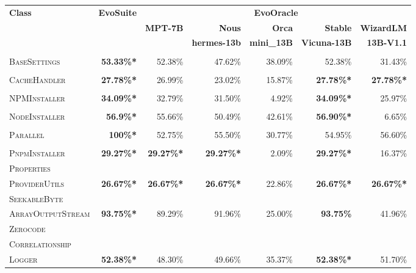 \begin{table}[H]
\centering

\begin{tabular}{| l | r | r | r | r | r | r |}
\hline
\multirow{2}{*}{\textbf{Class}} & \multirow{2}{*}{\textbf{EvoSuite}} & \multicolumn{5}{c|}{\textbf{EvoOracle}} \\ %
\cline{3-7} %
 &  & \textbf{MPT-7B} & \textbf{Nous} & \textbf{Orca} & \textbf{Stable} & \textbf{WizardLM} \\
 &  &  & \textbf{hermes-13b} & \textbf{mini\_13B} & \textbf{Vicuna-13B} & \textbf{13B-V1.1} \\
\hline
\scriptsize\textsc{} &  &  &  &  &  &  \\
\scriptsize\textsc{BaseSettings} & \textbf{53.33\%*} & 52.38\% & 47.62\% & 38.09\% & 52.38\% & 31.43\% \\
\hline
\scriptsize\textsc{} &  &  &  &  &  &  \\
\scriptsize\textsc{CacheHandler} & \textbf{27.78\%*} & 26.99\% & 23.02\% & 15.87\% & \textbf{27.78\%*} & \textbf{27.78\%*}  \\
\hline
\scriptsize\textsc{} &  &  &  &  &  &  \\
\scriptsize\textsc{NPMInstaller} & \textbf{34.09\%*} & 32.79\% & 31.50\% & 4.92\% & \textbf{34.09\%*} & 25.97\%  \\
\hline
\scriptsize\textsc{} &  &  &  &  &  &  \\
\scriptsize\textsc{NodeInstaller} & \textbf{56.9\%*} & 55.66\% & 50.49\% & 42.61\% & \textbf{56.90\%*} & 6.65\%  \\
\hline
\scriptsize\textsc{} &  &  &  &  &  &  \\
\scriptsize\textsc{Parallel} & \textbf{100\%*} & 52.75\% & 55.50\% & 30.77\% & 54.95\% & 56.60\%  \\
\hline
\scriptsize\textsc{} &  &  &  &  &  &  \\
\scriptsize\textsc{PnpmInstaller} & \textbf{29.27\%*} & \textbf{29.27\%*} & \textbf{29.27\%*} & 2.09\% & \textbf{29.27\%*} & 16.37\%  \\
\hline
\scriptsize\textsc{Properties} &  &  &  &  &  &  \\
\scriptsize\textsc{ProviderUtils} & \textbf{26.67\%*} & \textbf{26.67\%*} & \textbf{26.67\%*} & 22.86\% & \textbf{26.67\%*} & \textbf{26.67\%*}  \\
\hline
\scriptsize\textsc{SeekableByte} &  &  &  &  &  &  \\
\scriptsize\textsc{ArrayOutputStream} & \textbf{93.75\%*} & 89.29\% & 91.96\% & 25.00\% & \textbf{93.75\%} & 41.96\%  \\
\hline
\scriptsize\textsc{Zerocode} &  &  &  &  &  &  \\
\scriptsize\textsc{Correlationship} &  &  &  &  &  &  \\
\scriptsize\textsc{Logger} & \textbf{52.38\%*} & 48.30\% & 49.66\% & 35.37\% & \textbf{52.38\%*} & 51.70\%  \\
\hline


\end{tabular}
\end{table}
